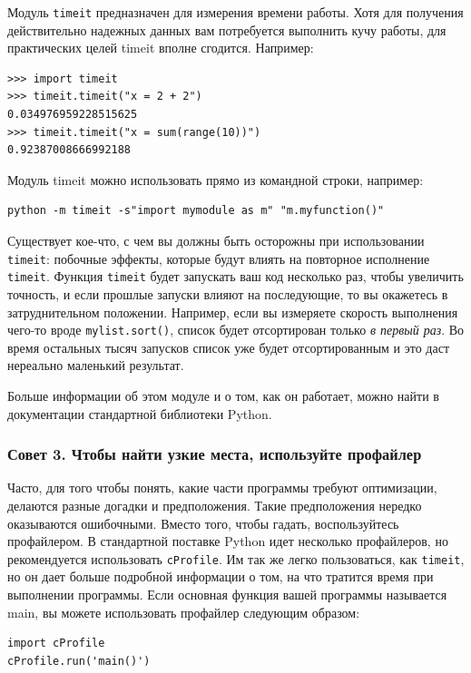 Модуль \texttt{timeit} предназначен для измерения времени работы. Хотя для получения действительно надежных данных вам потребуется выполнить кучу работы, для практических целей timeit вполне сгодится. Например:

\begin{lstlisting}
>>> import timeit
>>> timeit.timeit("x = 2 + 2")
0.034976959228515625
>>> timeit.timeit("x = sum(range(10))")
0.92387008666992188
\end{lstlisting}

Модуль timeit можно использовать прямо из командной строки, например:

\begin{lstlisting}
python -m timeit -s"import mymodule as m" "m.myfunction()"
\end{lstlisting}

Существует кое-что, с чем вы должны быть осторожны при использовании \texttt{timeit}: побочные эффекты, которые будут влиять на повторное исполнение \texttt{timeit}. Функция \texttt{timeit} будет запускать ваш код несколько раз, чтобы увеличить точность, и если прошлые запуски влияют на последующие, то вы окажетесь в затруднительном положении. Например, если вы измеряете скорость выполнения чего-то вроде \texttt{mylist.sort()}, список будет отсортирован только \textit{в первый раз}. Во время остальных тысяч запусков список уже будет отсортированным и это даст нереально маленький результат.

Больше информации об этом модуле и о том, как он работает, можно найти в документации стандартной библиотеки Python.

\subsubsection*{Совет 3. Чтобы найти узкие места, используйте профайлер}

Часто, для того чтобы понять, какие части программы требуют оптимизации, делаются разные догадки и предположения. Такие предположения нередко оказываются ошибочными. Вместо того, чтобы гадать, воспользуйтесь профайлером. В стандартной поставке Python идет несколько профайлеров, но рекомендуется использовать \texttt{cProfile}. Им так же легко пользоваться, как \texttt{timeit}, но он дает больше подробной информации о том, на что тратится время при выполнении программы. Если основная функция вашей программы называется main, вы можете использовать профайлер следующим образом:

\begin{lstlisting}
import cProfile
cProfile.run('main()')
\end{lstlisting}

